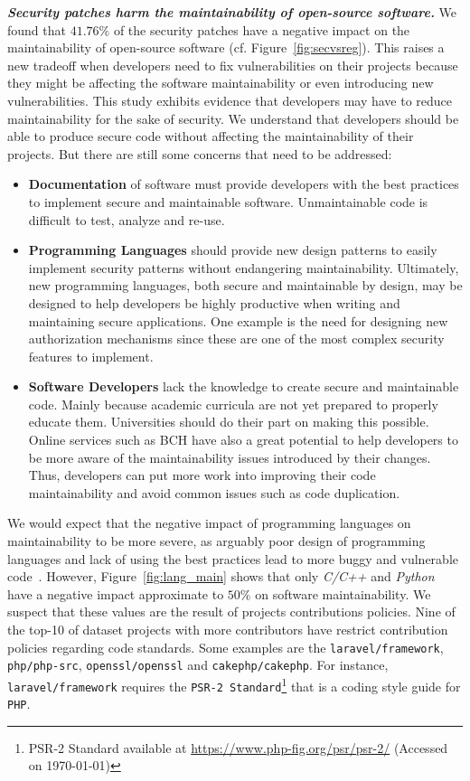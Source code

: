 \documentclass[sigconf,review]{acmart}
\begin{document}
\textbf{\textit{Security patches harm the maintainability of open-source software.}}
%
We found that $41.76\%$ of the security patches have a negative impact on the
maintainability of open-source software (cf. Figure~\ref{fig:secvsreg}). This raises
a new tradeoff when developers need to fix vulnerabilities on their projects
because they might be affecting the software maintainability or even introducing
new vulnerabilities. This study exhibits evidence that developers may have to
reduce maintainability for the sake of security. We understand that developers
should be able to produce secure code without affecting the maintainability of
their projects. But there are still some concerns that need to be addressed:
\begin{itemize}
	\item \textbf{Documentation} of software must provide developers with the
	best practices to implement secure and maintainable software. Unmaintainable
	code is difficult to test, analyze and re-use.

	\item\textbf{Programming Languages} should provide new design patterns to
	easily implement security patterns without endangering maintainability.
	Ultimately, new programming languages, both secure and maintainable by design,
	may be designed to help developers be highly productive when writing and
	maintaining  secure applications. One example is the need for designing new
	authorization mechanisms since these are one of the most complex security
	features to implement.

	\item \textbf{Software Developers} lack the knowledge to create secure and
	maintainable code. Mainly because academic curricula are not yet prepared
	to properly educate them. Universities should do their part on making
	this possible. Online services such as BCH have also a great potential to help
	developers to be more aware of the maintainability issues introduced by their
	changes. Thus, developers can put more work into improving their code maintainability
	and avoid common issues such as code duplication.

\end{itemize}


We would expect that the negative impact of programming languages on
maintainability to be more severe, as arguably poor design of programming
languages and lack of using the best practices lead to more buggy and vulnerable
code~\cite{Ray:2017:LSP:3144574.3126905, 2019arXiv190110220B}. However,
Figure~\ref{fig:lang_main} shows that only \emph{C/C++} and \emph{Python} have a negative impact approximate to $50\%$ on software maintainability. We suspect that these values are
the result of projects contributions policies. Nine of the top-10 of dataset projects 
with more contributors have restrict contribution policies regarding code
standards. Some examples are the \texttt{laravel/framework},
\texttt{php/php-src}, \texttt{openssl/openssl} and \texttt{cakephp/cakephp}. For
instance, \texttt{laravel/framework} requires the \texttt{PSR-2
Standard}\footnote{PSR-2 Standard available at
\url{https://www.php-fig.org/psr/psr-2/} (Accessed on \today{})} that is a coding style guide for \texttt{PHP}.
\end{document}
